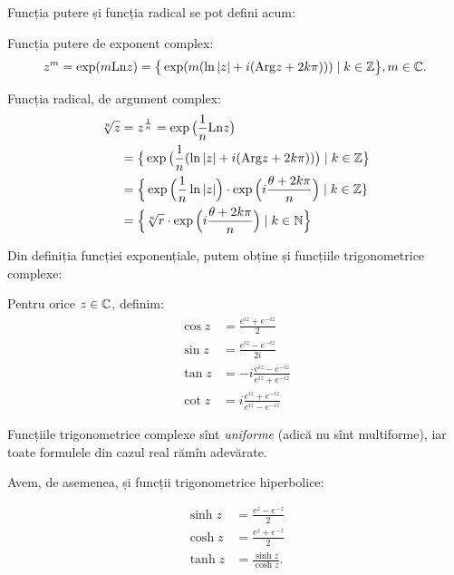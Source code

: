 Funcția putere și funcția radical se pot defini acum:
\begin{definition}\label{def:putere-radical-c}
  Funcția putere de exponent complex:
  \[
    z^m = \exp(m \mathrm{Ln}z) = \big\{ \exp(m(\ln|z| + i(\mathrm{Arg}z + 2k\pi))) %
    \mid k \in \ZZ \big\}, m \in \CC.
  \]

  Funcția radical, de argument complex:
  \begin{align*}
    \sqrt[n]{z} &= z^{\frac{1}{n}} = \exp\big( \frac{1}{n}\mathrm{Ln}z \big) \\
                &= \big\{ \exp\big( \frac{1}{n}(\ln|z| + i(\mathrm{Arg}z + 2k\pi)) \big) \mid %
                  k \in \ZZ \big\} \\
                &= \Big\{ \exp\Big(\frac{1}{n} \ln|z|\Big) \cdot %
                  \exp\Big(i \frac{\theta + 2 k\pi}{n} \Big) \mid k \in \ZZ \} \\
                &= \Big\{ \sqrt[n]{r} \cdot \exp\Big( i \frac{\theta + 2 k\pi}{n}\Big) %
                  \mid k \in \NN \Big\}
  \end{align*}
\end{definition}

Din definiția funcției exponențiale, putem obține și funcțiile trigonometrice
complexe:
\begin{definition}\label{def:trig-c}
  Pentru orice $ z \in \mathbb{C} $, definim:
  \begin{align*}
    \cos z &= \frac{e^{iz} + e^{-iz}}{2} \\
    \sin z &= \frac{e^{iz} - e^{-iz}}{2i} \\
    \tan z &= -i \frac{e^{iz} - e^{-iz}}{e^{iz} + e^{-iz}} \\
    \cot z &= i \frac{e^{iz} + e^{-iz}}{e^{iz} - e^{-iz}}
  \end{align*}
\end{definition}

\begin{remark}\label{rk:trig-unif}
  Funcțiile trigonometrice complexe sînt \emph{uniforme} (adică nu sînt multiforme),
  iar toate formulele din cazul real rămîn adevărate.
\end{remark}

Avem, de asemenea, și funcții trigonometrice hiperbolice:

\begin{definition}\label{def:trig-hip-c}
  \begin{align*}
    \sinh z &= \frac{e^z - e^{-z}}{2} \\
    \cosh z &= \frac{e^z + e^{-z}}{2} \\
    \tanh z &= \frac{\sinh z}{\cosh z}.
  \end{align*}
\end{definition}

